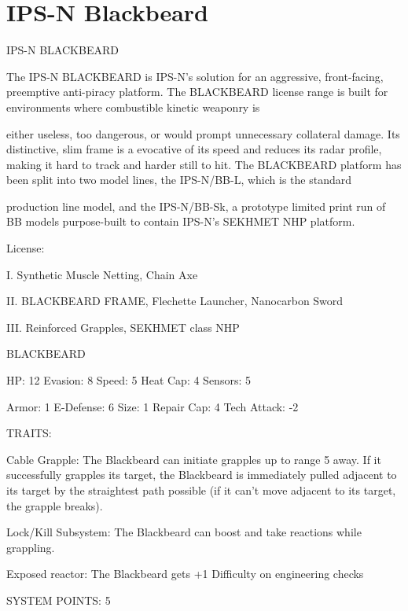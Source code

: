 \section{IPS-N Blackbeard}

                                         IPS-N BLACKBEARD 
 

The IPS-N BLACKBEARD is IPS-N’s solution for an aggressive, front-facing, preemptive anti-piracy  
platform. The BLACKBEARD license range is built for environments where combustible kinetic weaponry is  

either useless, too dangerous, or would prompt unnecessary collateral damage. Its distinctive, slim frame is  
a evocative of its speed and reduces its radar profile, making it hard to track and harder still to hit. The  
BLACKBEARD platform has been split into two model lines, the IPS-N/BB-L, which is the standard  

production line model, and the IPS-N/BB-Sk, a prototype limited print run of BB models purpose-built to  
contain IPS-N’s SEKHMET NHP platform. 
 
                                                     License:
 
I. Synthetic Muscle Netting, Chain Axe
 
II. BLACKBEARD FRAME, Flechette Launcher, Nanocarbon Sword
 
III. Reinforced Grapples, SEKHMET class NHP
 

                                                BLACKBEARD 

  HP: 12          Evasion: 8                             Speed: 5            Heat Cap: 4        Sensors: 5 

  Armor: 1        E-Defense: 6                           Size: 1             Repair Cap: 4      Tech Attack: -2 

                                                     TRAITS: 

  Cable Grapple: The Blackbeard can initiate grapples up to range 5 away. If it successfully grapples its  
  target, the Blackbeard is immediately pulled adjacent to its target by the straightest path possible (if it  
  can’t move adjacent to its target, the grapple breaks).
 
  Lock/Kill Subsystem: The Blackbeard can boost and take reactions while grappling.
 
  Exposed reactor: The Blackbeard gets +1 Difficulty on engineering checks 

                                               SYSTEM POINTS: 5 

